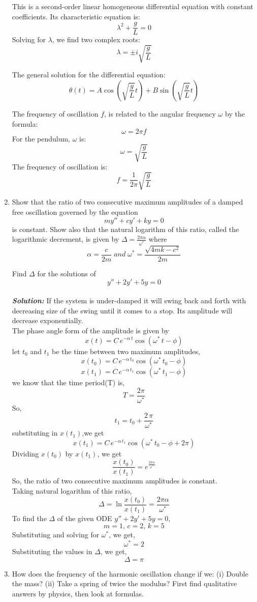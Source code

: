 \documentclass[]{book}
\theoremstyle{definition}
\begin{document}
\begin{enumerate}
This is a second-order linear homogeneous differential equation with constant coefficients. Its characteristic equation is:
\[ \lambda^2 + \frac{g}{L} = 0 \]
Solving for $\lambda$, we find two complex roots:
\[ \lambda = \pm i \sqrt{\frac{g}{L}} \]

The general solution for the differential equation:
\[ \theta(t) = A \cos \left( \sqrt{\frac{g}{L}} t \right) + B \sin \left( \sqrt{\frac{g}{L}} t \right) \]

The frequency of oscillation $f$, is related to the angular frequency $\omega$ by the formula:
\[ \omega = 2\pi f \]
For the pendulum, $\omega$ is:
\[ \omega = \sqrt{\frac{g}{L}} \]
The frequency of oscillation is:
\[f = \frac{1}{2\pi} \sqrt{\frac{g}{L}} \]

\item 
Show that the ratio of two consecutive maximum amplitudes of a damped free oscillation governed by the equation
\[ m y'' + c y' + k y = 0 \]
is constant. Show also that the natural logarithm of this ratio, called the logarithmic decrement, is given by $\Delta = \frac{2\pi \alpha}{\omega^*}$
where
\[ \alpha = \frac{c}{2m}\; and\; \omega^* = \frac{\sqrt{4mk - c^2}}{2m} \]

Find $\Delta$ for the solutions of
\[ {y}'' + 2{y}' + 5y = 0 \]\\
\emph{\textbf{Solution:}}
If the system is under-damped it will swing back and forth with decreasing size of the swing until it comes to a stop. Its amplitude will decrease exponentially.
\\
The phase angle form of the amplitude is given by
\[
x(t) = C\,e^{-\alpha\,t}\cos(\omega^*\,t - \phi)
\]
let $t_0$ and $t_1$ be the time between two maximum amplitudes, 
\[
x(t_0) = C\,e^{-\alpha\,t_0}\cos(\omega^*\,t_0 - \phi)
\]
\[
x(t_1) = C\,e^{-\alpha\,t_1}\cos(\omega^*\,t_1 - \phi)
\]
we know that the time period(T) is,
\[
T = \frac{2\pi}{\omega^*}
\]
So,
\[
t_1 = t_0 +\frac{2\,\pi}{\omega^*} 
\]
substituting in $x({t_1})$,we get
\[
x(t_1) = C\,e^{-\alpha\,t_1}\cos(\omega^*\,t_0 - \phi + 2\pi)
\]
Dividing $x({t_0})$ by $x({t_1})$, we get
\[
\frac{x({t_0})}{x({t_1})} = e^{\frac{2 \pi \alpha}{\omega^*}}
\]
So, the ratio of two consecutive maximum amplitudes is constant.\\
Taking natural logarithm of this ratio,
\[
\Delta = \ln{\frac{x({t_0})}{x({t_1})}} = \frac{2 \pi \alpha}{\omega^*}
\]
To find the $\Delta$ of the given ODE ${y}'' + 2{y}' + 5y = 0$,
\[
m = 1,\,c = 2,\,k = 5
\]
Substituting and solving for $\omega^*$, we get,
\[
\omega^* = 2
\]
Substituting the values in $\Delta$, we get,
\[
\Delta = \pi
\]
\item 
How does the frequency of the harmonic oscillation change if we:
(i) Double the mass?
(ii) Take a spring of twice the modulus? First find qualitative answers by physics, then look at formulas.\\


\end{enumerate}
\end{document}
